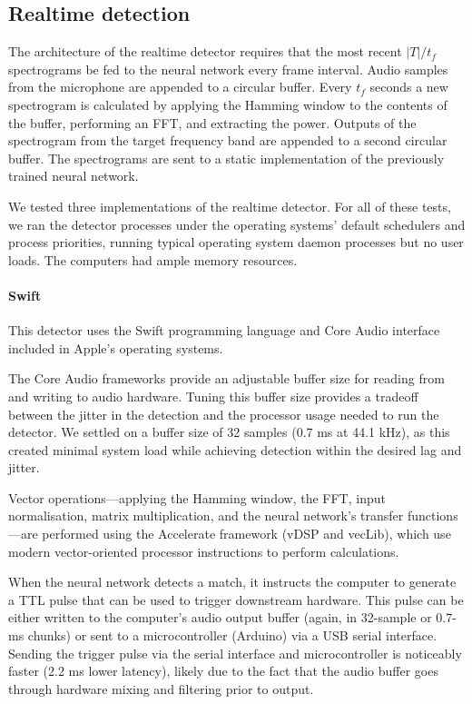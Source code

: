 \documentclass[10pt,letterpaper]{article}
\renewcommand{\subsubsection}[1]{\paragraph{#1}}
\begin{document}
\subsection{Realtime detection}

The architecture of the realtime detector requires that the most
recent $|T|/t_f$ spectrograms be fed to the neural network every
frame interval.  Audio samples from the microphone
are appended to a circular buffer.  Every $t_f$ seconds a new
spectrogram is calculated by applying the Hamming window to the
contents of the buffer, performing an FFT, and extracting the
power. Outputs of the spectrogram from the target frequency band are
appended to a second circular buffer.  The spectrograms are sent to a
static implementation of the previously trained neural network.

We tested three implementations of the realtime detector.  For all of
these tests, we ran the detector processes under the operating
systems' default schedulers and process priorities, running typical
operating system daemon processes but no user loads.  The computers
had ample memory resources.

\subsubsection{Swift}

This detector uses the Swift programming language and Core Audio
interface included in Apple's operating systems.

The Core Audio frameworks provide an adjustable buffer size for 
reading from and writing to audio hardware. Tuning this buffer size
provides a tradeoff between the jitter in the detection and the 
processor usage needed to run the detector. We settled on a buffer 
size of 32 samples (0.7 ms at 44.1 kHz), as this created minimal system
load while achieving detection within the desired lag and jitter.

Vector operations---applying the Hamming window, the FFT, input
normalisation, matrix multiplication, and the neural network's
transfer functions---are performed using the Accelerate framework (vDSP
and vecLib), which use modern vector-oriented processor instructions
to perform calculations.

When the neural network detects a match, it instructs the computer to
generate a TTL pulse that can be used to trigger downstream hardware.
This pulse can be either written to the computer's audio output buffer (again, in
32-sample or 0.7-ms chunks) or sent to a microcontroller (Arduino) via
a USB serial interface. Sending the trigger pulse via the serial
interface and microcontroller is noticeably faster (2.2 ms lower
latency), likely due to the fact that the audio buffer goes through
hardware mixing and filtering prior to output.
\end{document}

